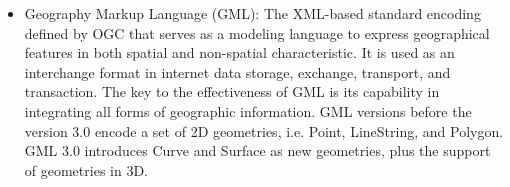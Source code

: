 \documentclass[a4paper,12pt]{article}
\begin{document}
\begin{itemize}


\item Geography Markup Language (GML): The XML-based standard encoding defined by OGC that serves as a modeling language to express geographical features in both spatial and non-spatial characteristic. It is used as an interchange format in internet data storage, exchange, transport, and transaction. The key to the effectiveness of GML is its capability in integrating all forms of geographic information. %
GML versions before the version 3.0 encode a set of 2D geometries, i.e. Point, LineString, and Polygon. GML 3.0 introduces Curve and Surface as new geometries, plus the support of geometries in 3D.


\end{itemize}
\end{document}
